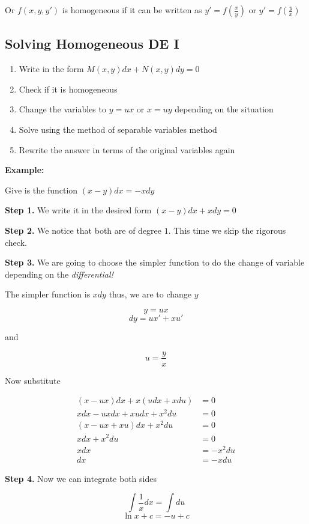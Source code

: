 Or \(f(x,y,y')\) is homogeneous if it can be written as \(y' = f(\frac{x}{y})\) or \(y' = f(\frac{y}{x})\)

\subsection{Solving Homogeneous DE I}

\begin{enumerate}
    \item Write in the form \(M(x,y)dx + N(x,y)dy = 0\)
    \item Check if it is homogeneous
    \item Change the variables to \(y = ux\) or \(x = uy\) depending on the situation
    \item Solve using the method of separable variables method
    \item Rewrite the answer in terms of the original variables again
\end{enumerate}

\textbf{Example:}

Give is the function \((x -y)dx = - xdy\)

\textbf{Step 1.} We write it in the desired form \((x - y)dx + xdy = 0\)

\textbf{Step 2.} We notice that both are of degree \(1\). This time we skip the rigorous check.

\textbf{Step 3.} We are going to choose the simpler function to do the change of variable 
depending on the \emph{differential!} 

The simpler function is \(xdy\) thus, we are to change \(y\)

\[
    y = ux
\]
\[
    dy = ux' + xu'
\]

and 

\[
    u = \frac{y}{x}
\]

Now substitute

\begin{align*}
    (x - ux)dx + x(udx + xdu) &= 0\\
    xdx - u x dx + x u dx + x^{2}du &= 0\\
    (x - ux + xu)dx + x^{2}du &= 0\\
    xdx + x^{2}du &= 0\\
    xdx &= - x^{2}du\\
    dx &= - xdu
\end{align*}

\textbf{Step 4.} Now we can integrate both sides

\[
    \int \frac{1}{x}dx = \int du
\]
\[
    \ln x + c = -u + c
\]

